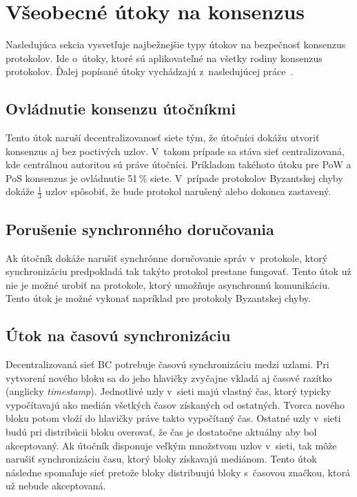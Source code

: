 \section{Všeobecné útoky na konsenzus}
Nasledujúca sekcia vysvetľuje najbežnejšie typy útokov na bezpečnosť konsenzus protokolov. Ide o~útoky, ktoré sú aplikovateľné na všetky rodiny konsenzus protokolov. Ďalej popísané útoky vychádzajú z~nasledujúcej práce~\cite{homoliakBlockchain}. 

\subsection{Ovládnutie konsenzu útočníkmi}
Tento útok naruší decentralizovanosť siete tým, že útočníci dokážu utvoriť konsenzus aj bez poctivých uzlov. V~takom prípade sa stáva sieť centralizovaná, kde centrálnou autoritou sú práve útočníci. Príkladom takéhoto útoku pre PoW a PoS konsenzus je ovládnutie 51\,\% siete. V~prípade protokolov Byzantskej chyby dokáže $\frac{1}{3}$ uzlov spôsobiť, že bude protokol narušený alebo dokonca zastavený.

\subsection{Porušenie synchronného doručovania}

Ak útočník dokáže narušiť synchrónne doručovanie správ v~protokole, ktorý synchronizáciu predpokladá tak takýto protokol prestane fungovať. Tento útok už nie je možné urobiť na protokole, ktorý umožňuje asynchronnú komunikáciu. Tento útok je možné vykonať napríklad pre protokoly Byzantskej chyby.

\subsection{Útok na časovú synchronizáciu}
Decentralizovaná sieť BC potrebuje časovú synchronizáciu medzi uzlami. Pri vytvorení nového bloku sa do jeho hlavičky zvyčajne vkladá aj časové razítko (anglicky \textit{timestamp}). Jednotlivé uzly v~sieti majú vlastný čas, ktorý typicky vypočítavajú ako medián všetkých časov získaných od ostatných. Tvorca nového bloku potom vloží do hlavičky práve takto vypočítaný čas. Ostatné uzly v~sieti budú pri distribúcii bloku overovať, že čas je dostatočne aktuálny aby bol akceptovaný. Ak útočník disponuje veľkým množstvom uzlov v~sieti, tak môže narušiť synchronizáciu času, ktorý bloky získavajú mediánom. Tento útok následne spomaľuje sieť pretože bloky distribuujú bloky s~časovou značkou, ktorá už nebude akceptovaná.


